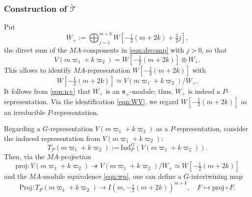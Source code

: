 \documentclass[reqno,11pt]{amsart}
\theoremstyle{remark}
\numberwithin{equation}{section}
\newcommand{\fn}{{\mathfrak n}}
\newcommand{\Cal}{\mathcal}
\newcommand{\Ind}{\mathrm{Ind}}
\newcommand{\To}{\longrightarrow}
\newcommand{\wT}{\widetilde{\Cal{T}}}
\newcommand{\proj}{\mathrm{proj}}
\newcommand{\Proj}{\mathrm{Proj}}
\begin{document}
\subsubsection{Construction of $\wT$}
\label{sec:wT}
Put
\begin{equation*}
W_+:=\bigoplus_{j=1}^{m+k}W[-\tfrac{1}{2}(m+2k)+\tfrac{3}{2}j],
\end{equation*}
the direct sum of the $MA$-components in \eqref{eqn:decomp} with $j> 0$, so that
\begin{equation*}
V(m\varpi_1 + k\varpi_2) = 
W[-\tfrac{1}{2}(m+2k)] \oplus W_+.
\end{equation*}
This allows to identify $MA$-representation $W[-\tfrac{1}{2}(m+2k)]$ with
\begin{equation}\label{eqn:WV}
W[-\tfrac{1}{2}(m+2k)]  \simeq V(m\varpi_1 + k \varpi_2)/W_+.
\end{equation}
It follows from \eqref{eqn:n+} that $W_+$ is an $\fn_+$-module; thus,
$W_+$ is indeed a $P$-representation. Via the identification \eqref{eqn:WV}, 
we regard $W[-\tfrac{1}{2}(m+2k)]$ as an irreducible $P$-representation.

Regarding a $G$-representation $V(m\varpi_1 + k\varpi_2)$ as a $P$-representation,
consider the induced representation from 
$V(m\varpi_1 + k\varpi_2)$:
\begin{equation*}
T_P(m\varpi_1 + k\varpi_2)
:=\Ind_{P}^G(V(m\varpi_1 + k\varpi_2)).
\end{equation*}
Then, via the $MA$-projection
\begin{equation}\label{eqn:proj1}
\proj\colon V(m\varpi_1 + k \varpi_2) \twoheadrightarrow 
V(m\varpi_1 + k \varpi_2)/W_+ \simeq W[-\tfrac{1}{2}(m+2k)]
\end{equation}
and the $MA$-module equivalence \eqref{eqn:wp}, 
one can define a $G$-intertwining map
\begin{equation}\label{eqn:proj2}
\Proj\colon 
T_P(m\varpi_1 + k \varpi_2) \To I(m, -\tfrac{1}{2}(m+2k))^{m+k},
\quad 
F\mapsto \proj \circ F.
\end{equation}

\vskip 0.1in
\end{document}
